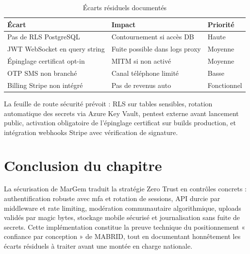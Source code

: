 \begin{table}[H]
  \centering
  \caption{Écarts résiduels documentés}
  \label{tab:residual-risks}
  \small
  \begin{tabularx}{\textwidth}{@{}lXl@{}}
    \toprule
    \textbf{Écart} & \textbf{Impact} & \textbf{Priorité} \\
    \midrule
    Pas de RLS PostgreSQL & Contournement si accès DB & Haute \\
    JWT WebSocket en query string & Fuite possible dans logs proxy & Moyenne \\
    Épinglage certificat opt-in & MITM si non activé & Moyenne \\
    OTP SMS non branché & Canal téléphone limité & Basse \\
    Billing Stripe non intégré & Pas de revenus auto & Fonctionnel \\
    \bottomrule
  \end{tabularx}
\end{table}

La feuille de route sécurité prévoit : RLS sur tables sensibles, rotation automatique des secrets via Azure Key Vault, pentest externe avant lancement public, activation obligatoire de l'épinglage certificat sur builds production, et intégration webhooks Stripe avec vérification de signature.

\section{Conclusion du chapitre}

La sécurisation de MarGem traduit la stratégie Zero Trust en contrôles concrets : authentification robuste avec \gls{mfa} et rotation de sessions, API durcie par middleware et rate limiting, modération communautaire algorithmique, uploads validés par magic bytes, stockage mobile sécurisé et journalisation sans fuite de secrets. Cette implémentation constitue la preuve technique du positionnement « confiance par conception » de MABRID, tout en documentant honnêtement les écarts résiduels à traiter avant une montée en charge nationale.

